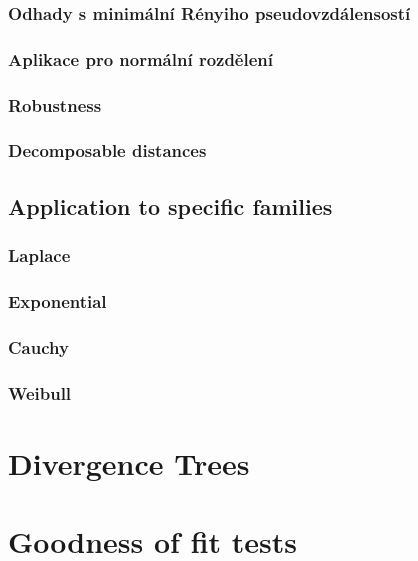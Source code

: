 			\subsection{Odhady s minimální Rényiho pseudovzdálensostí}

			\subsection{Aplikace pro normální rozdělení}
			
		\subsection{Robustness}
		
		\subsection{Decomposable distances}
	
	\section{Application to specific families}

		\subsection{Laplace}
		
		\subsection{Exponential}
		
		\subsection{Cauchy}
		
		\subsection{Weibull}
	
\chapter{Divergence Trees}

\chapter{Goodness of fit tests}